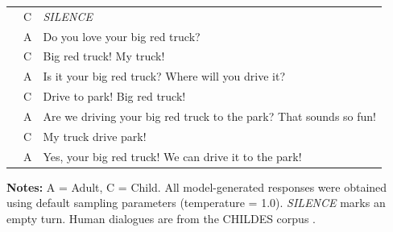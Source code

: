 \begin{table}[h]
\begin{tabular}{l l p{}}
    & C & \textit{SILENCE} \\
    & A & Do you love your big red truck? \\
    & C & Big red truck! My truck! \\
    & A & Is it your big red truck? Where will you drive it? \\
    & C & Drive to park! Big red truck! \\
    & A & Are we driving your big red truck to the park? That sounds so fun! \\
    & C & My truck drive park! \\
    & A & Yes, your big red truck! We can drive it to the park! \\
    
    \bottomrule
    \end{tabular}
    
    \vspace{1mm}
    \raggedright
    \footnotesize
    \textbf{Notes:} A = Adult, C = Child. All model-generated responses were obtained using default sampling parameters (temperature = 1.0). \textit{SILENCE} marks an empty turn. Human dialogues are from the CHILDES corpus \citep{macwhinney2000childes}.
\end{table}

